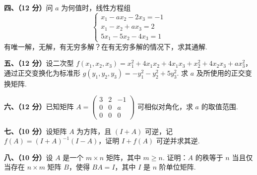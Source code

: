 \documentclass[a4paper,11pt]{ctexart}
\begin{document}
\vspace{0.8em}

\textbf{四、（12 分）}问 $a$ 为何值时，线性方程组
\[
  \begin{cases}
    x_1 - a x_2 - 2x_3 = -1 \\
    x_1 - x_2 + a x_3 = 2 \\
    5x_1 - 5x_2 - 4x_3 = 1
  \end{cases}
\]
有唯一解，无解，有无穷多解？在有无穷多解的情况下，求其通解.

\vspace{0.8em}

\textbf{五、（12 分）}设二次型 $f(x_1, x_2, x_3) = x_1^2 + 4x_1 x_2 + 4x_1 x_3 + x_2^2 + 4x_2 x_3 + a x_3^2$，通过正交变换化为标准形 $g(y_1, y_2, y_3) = -y_1^2 - y_2^2 + 5y_3^2$. 求 $a$ 及所使用的正交变换矩阵.

\vspace{0.8em}

\textbf{六、（12 分）}已知矩阵 $A = \begin{pmatrix} 3 & 2 & -1 \\ 0 & 0 & a \\ 0 & 0 & 0 \end{pmatrix}$ 可相似对角化，求 $a$ 的取值范围.

\vspace{0.8em}

\textbf{七、（10 分）}设矩阵 $A$ 为方阵，且 $(I + A)$ 可逆，记 $f(A) = (I + A)^{-1}(I - A)$，证明 $I + f(A)$ 可逆并求其逆.

\vspace{0.8em}

\textbf{八、（10 分）}设 $A$ 是一个 $m \times n$ 矩阵，其中 $m \ge n$. 证明：$A$ 的秩等于 $n$ 当且仅当存在 $n \times m$ 矩阵 $B$，使得 $BA = I$，其中 $I$ 是 $n$ 阶单位矩阵.
\end{document}
